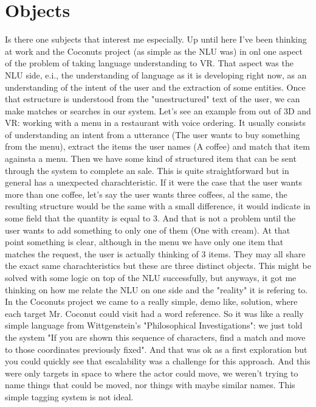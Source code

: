 \documentclass[12pt]{article}
\begin{document}
\section{Objects}
Is there one subjects that interest me especially. Up until here I've been thinking at work and the Coconuts project (as simple as the NLU was) in onl one aspect of the 
problem of taking language understanding to VR. That aspect was the NLU side, e.i., the understanding of language as it is developing right now, as an understanding of the intent 
of the user and the extraction of some entities. Once that estructure is understood from the "unestructured" text of the user, we can make matches or searches in our system. 
Let's see an example from out of 3D and VR: working with a menu in a restaurant with voice ordering. It usually consists of understanding an intent from a utterance (The user wants to 
buy something from the menu), extract the items the user names (A coffee) and match that item againsta a menu. Then we have some kind of structured item that can be sent through the system 
to complete an sale. This is quite straightforward but in general has a unexpected charachteristic. If it were the case that the user wants more than one coffee, let's say the user wants three 
coffees, al the same, the resulting structure would be the same with a small difference, it would indicate in some field that the quantity is equal to 3.
And that is not a problem until the user wants to add something to only one of them (One with cream). At that point something is clear, although in the menu we have only one item that 
matches the request, the user is actually thinking of 3 items. They may all share the exact same charachteristics but these are three distinct objects.
This might be solved with some logic on top of the NLU successfully, but anyways, it got me thinking on how me relate the NLU on one side and the "reality" it is refering to. 
In the Coconuts project we came to a really simple, demo like, solution, where each target Mr. Coconut could visit had a word reference. So it was like a really simple language from Wittgenstein's
"Philosophical Investigations": we just told the system "If you are shown this sequence of characters, find a match and move to those coordinates previously fixed". And that was ok as a first exploration 
but you could quickly see that escalability was a challenge for this approach. And this were only targets in space to where the actor could move, we weren't trying to name things that could be moved, 
nor things with maybe similar names. This simple tagging system is not ideal.
\end{document}

